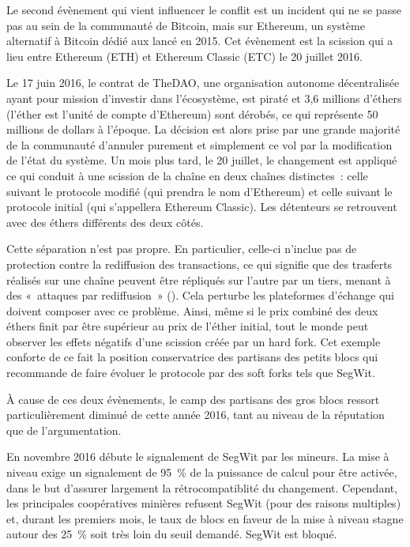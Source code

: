 Le second évènement qui vient influencer le conflit est un incident qui ne se passe pas au sein de la communauté de Bitcoin, mais sur Ethereum, un système alternatif à Bitcoin dédié aux  lancé en 2015. Cet évènement est la scission qui a lieu entre Ethereum (ETH) et Ethereum Classic (ETC) le 20 juillet 2016.

Le 17 juin 2016, le contrat de TheDAO, une organisation autonome décentralisée ayant pour mission d'investir dans l'écosystème, est piraté et 3,6 millions d'éthers (l'éther est l'unité de compte d'Ethereum) sont dérobés, ce qui représente 50 millions de dollars à l'époque. La décision est alors prise par une grande majorité de la communauté d'annuler purement et simplement ce vol par la modification de l'état du système. Un mois plus tard, le 20 juillet, le changement est appliqué ce qui conduit à une scission de la chaîne en deux chaînes distinctes~: celle suivant le protocole modifié (qui prendra le nom d'Ethereum) et celle suivant le protocole initial (qui s'appellera Ethereum Classic). Les détenteurs se retrouvent avec des éthers différents des deux côtés.

Cette séparation n'est pas propre. En particulier, celle-ci n'inclue pas de protection contre la rediffusion des transactions, ce qui signifie que des trasferts réalisés sur une chaîne peuvent être répliqués sur l'autre par un tiers, menant à des «~attaques par rediffusion~» (). Cela perturbe les plateformes d'échange qui doivent composer avec ce problème. Ainsi, même si le prix combiné des deux éthers finit par être supérieur au prix de l'éther initial, tout le monde peut observer les effets négatifs d'une scission créée par un hard fork. Cet exemple conforte de ce fait la position conservatrice des partisans des petits blocs qui recommande de faire évoluer le protocole par des soft forks tels que SegWit. 

À cause de ces deux évènements, le camp des partisans des gros blocs ressort particulièrement diminué de cette année 2016, tant au niveau de la réputation que de l'argumentation.

En novembre 2016 débute le signalement de SegWit par les mineurs. La mise à niveau exige un signalement de 95~\% de la puissance de calcul pour être activée, dans le but d'assurer largement la rétrocompatiblité du changement. Cependant, les principales coopératives minières refusent SegWit (pour des raisons multiples) et, durant les premiers mois, le taux de blocs en faveur de la mise à niveau stagne autour des 25~\% soit très loin du seuil demandé. SegWit est bloqué.


